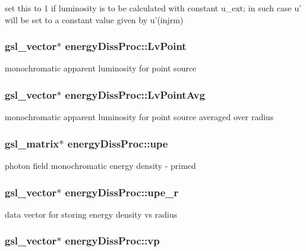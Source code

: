 set this to 1 if luminosity is to be calculated with constant u\-\_\-ext; in such case u' will be set to a constant value given by u'(injrm) \hypertarget{classenergyDissProc_aa8463250da28ef23c71540b1efb24ee4}{
\subsubsection[{Lv\-Point}]{\setlength{\rightskip}{0pt plus 5cm}gsl\-\_\-vector$\ast$ energy\-Diss\-Proc\-::\-Lv\-Point}}\label{classenergyDissProc_aa8463250da28ef23c71540b1efb24ee4}
monochromatic apparent luminosity for point source \hypertarget{classenergyDissProc_a25546d40225b971c1b3dddb8e8f71258}{
\subsubsection[{Lv\-Point\-Avg}]{\setlength{\rightskip}{0pt plus 5cm}gsl\-\_\-vector$\ast$ energy\-Diss\-Proc\-::\-Lv\-Point\-Avg}}\label{classenergyDissProc_a25546d40225b971c1b3dddb8e8f71258}
monochromatic apparent luminosity for point source averaged over radius \hypertarget{classenergyDissProc_aab57bc9681e8de22dc8a311e345bea53}{
\subsubsection[{upe}]{\setlength{\rightskip}{0pt plus 5cm}gsl\-\_\-matrix$\ast$ energy\-Diss\-Proc\-::upe}}\label{classenergyDissProc_aab57bc9681e8de22dc8a311e345bea53}
photon field monochromatic energy density -\/ primed \hypertarget{classenergyDissProc_ac925d66519c79f36421f75a6bc9f0965}{
\subsubsection[{upe\-\_\-r}]{\setlength{\rightskip}{0pt plus 5cm}gsl\-\_\-vector$\ast$ energy\-Diss\-Proc\-::upe\-\_\-r}}\label{classenergyDissProc_ac925d66519c79f36421f75a6bc9f0965}
data vector for storing energy density vs radius \hypertarget{classenergyDissProc_abede39343a0a978c8dc8a064c80d6990}{
\subsubsection[{vp}]{\setlength{\rightskip}{0pt plus 5cm}gsl\-\_\-vector$\ast$ energy\-Diss\-Proc\-::vp}}\label{classenergyDissProc_abede39343a0a978c8dc8a064c80d6990}
